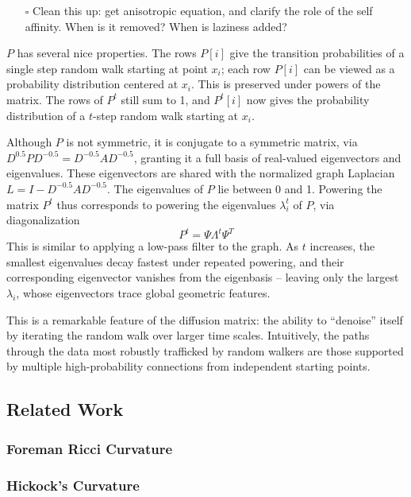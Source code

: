 \documentclass[
]{agujournal2019}
\providecommand{\tightlist}{%
  \setlength{\itemsep}{0pt}\setlength{\parskip}{0pt}}\usepackage{longtable,booktabs,array}
\begin{document}
\begin{itemize}
\tightlist
\item[$\square$]
  Clean this up: get anisotropic equation, and clarify the role of the
  self affinity. When is it removed? When is laziness added?
\end{itemize}

\(P\) has several nice properties. The rows \(P[i]\) give the transition
probabilities of a single step random walk starting at point \(x_{i}\);
each row \(P[i]\) can be viewed as a probability distribution centered
at \(x_{i}\). This is preserved under powers of the matrix. The rows of
\(P^t\) still sum to 1, and \(P^t[i]\) now gives the probability
distribution of a \(t\)-step random walk starting at \(x_{i}\).

Although \(P\) is not symmetric, it is conjugate to a symmetric matrix,
via \(D^{0.5}PD^{-0.5} = D^{-0.5}AD^{-0.5}\), granting it a full basis
of real-valued eigenvectors and eigenvalues. These eigenvectors are
shared with the normalized graph Laplacian
\(L = I - D^{-0.5}AD^{-0.5}\). The eigenvalues of \(P\) lie between 0
and 1. Powering the matrix \(P^t\) thus corresponds to powering the
eigenvalues \(\lambda_{i}^t\) of \(P\), via diagonalization \[
P^t = \Psi \Lambda^t \Psi^T
\] This is similar to applying a low-pass filter to the graph. As \(t\)
increases, the smallest eigenvalues decay fastest under repeated
powering, and their corresponding eigenvector vanishes from the
eigenbasis -- leaving only the largest \(\lambda_{i}\), whose
eigenvectors trace global geometric features.

This is a remarkable feature of the diffusion matrix: the ability to
``denoise'' itself by iterating the random walk over larger time scales.
Intuitively, the paths through the data most robustly trafficked by
random walkers are those supported by multiple high-probability
connections from independent starting points.

\subsection{Related Work}\label{related-work}

\subsubsection{Foreman Ricci Curvature}\label{foreman-ricci-curvature}

\subsubsection{Hickock's Curvature}\label{hickocks-curvature}
\end{document}
